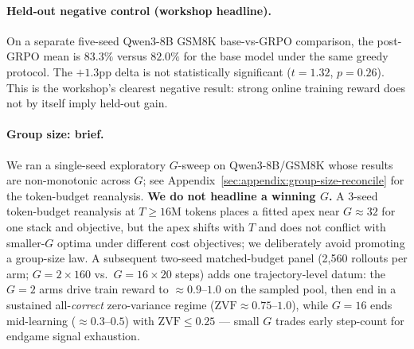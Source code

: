\documentclass{article}
\begin{document}
\paragraph{Held-out negative control (workshop headline).}
On a separate five-seed Qwen3-8B GSM8K base-vs-GRPO comparison, the post-GRPO
mean is $83.3\%$ versus $82.0\%$ for the base model under the same greedy
protocol. The $+1.3$pp delta is not statistically significant
($t{=}1.32$, $p{=}0.26$). This is the workshop's clearest negative result:
strong online training reward does not by itself imply held-out gain.

\paragraph{Group size: brief.}
We ran a single-seed exploratory $G$-sweep on Qwen3-8B/GSM8K whose results
are non-monotonic across $G$; see
Appendix~\ref{sec:appendix:group-size-reconcile} for the token-budget
reanalysis. \textbf{We do not headline a winning $G$.} A 3-seed
token-budget reanalysis at $T{\ge}16$M tokens places a fitted apex near
$G{\approx}32$ for one stack and objective, but the apex shifts with $T$ and
does not conflict with smaller-$G$ optima under different cost objectives; we
deliberately avoid promoting a group-size law. A subsequent two-seed matched-budget
panel (2{,}560 rollouts per arm; $G{=}2\times160$ vs.\ $G{=}16\times20$
steps) adds one trajectory-level datum: the $G{=}2$ arms drive train
reward to $\approx0.9$--$1.0$ on the sampled pool, then end in a sustained
all-\emph{correct} zero-variance regime ($\mathrm{ZVF}\approx0.75$--$1.0$),
while $G{=}16$ ends mid-learning ($\approx0.3$--$0.5$) with
$\mathrm{ZVF}\le0.25$ --- small $G$ trades early
step-count for endgame signal exhaustion.
\end{document}
